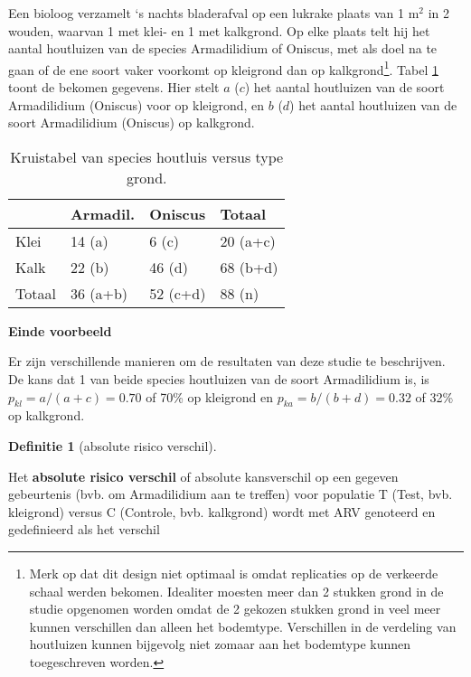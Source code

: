 \documentclass[
  12pt,dutch,coursenotes]{book}
\theoremstyle{definition}
\newtheorem{definition}{Definitie}[chapter]
\theoremstyle{definition}
\theoremstyle{definition}
\theoremstyle{remark}
\begin{document}
Een bioloog verzamelt `s nachts bladerafval op een lukrake plaats van 1 m\(^2\)
in 2 wouden, waarvan 1 met klei- en 1 met kalkgrond. Op elke plaats telt hij het aantal houtluizen van de species
Armadilidium of Oniscus, met als doel na te gaan of de ene soort vaker voorkomt op kleigrond dan op
kalkgrond\footnote{Merk op dat dit design niet optimaal is omdat replicaties op de verkeerde schaal werden bekomen. Idealiter moesten meer dan 2 stukken grond in de studie opgenomen worden omdat de 2 gekozen stukken grond in veel meer kunnen verschillen dan alleen het bodemtype. Verschillen in de verdeling van houtluizen kunnen bijgevolg niet zomaar aan het bodemtype kunnen toegeschreven worden.}. Tabel \ref{tab:cox} toont de bekomen gegevens. Hier stelt \(a\) (\(c\)) het aantal houtluizen van de soort Armadilidium (Oniscus) voor op kleigrond, en \(b\) (\(d\)) het aantal houtluizen van de soort Armadilidium (Oniscus) op kalkgrond.

\begin{table}

\caption{\label{tab:cox}Kruistabel van species houtluis versus type grond.}
\centering
\begin{tabular}[t]{llll}
\toprule
  & Armadil. & Oniscus & Totaal\\
\midrule
Klei & 14 (a) & 6 (c) & 20 (a+c)\\
Kalk & 22 (b) & 46 (d) & 68 (b+d)\\
Totaal & 36 (a+b) & 52 (c+d) & 88 (n)\\
\bottomrule
\end{tabular}
\end{table}

\textbf{Einde voorbeeld}

Er zijn verschillende manieren om de resultaten van deze studie te
beschrijven. De kans dat 1 van beide species houtluizen van de soort Armadilidium is, is \(p_{kl}=a/(a+c)=0.70\) of 70\% op kleigrond en \(p_{ka}=b/(b+d)=0.32\) of 32\% op kalkgrond.

\begin{definition}[absolute risico verschil]
\protect\hypertarget{def:unnamed-chunk-110}{}{\label{def:unnamed-chunk-110} \iffalse (absolute risico verschil) \fi{} }
\end{definition}
Het \textbf{absolute risico verschil} of absolute kansverschil op een gegeven gebeurtenis (bvb. om Armadilidium aan te treffen) voor populatie T (Test, bvb. kleigrond) versus C (Controle, bvb. kalkgrond) wordt
met ARV genoteerd en gedefinieerd als het verschil
\end{document}
